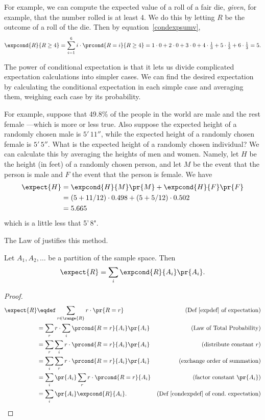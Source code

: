 For example, we can compute the expected value of a roll of a fair die,
\emph{given}, for example, that the number rolled is at least 4.  We do
this by letting $R$ be the outcome of a roll of the die.  Then
by equation~\eqref{condexpsumv},
\[
\expcond{R}{R \geq 4} = \sum_{i=1}^6 i \cdot \prcond{R=i}{R \ge 4} 
= 1\cdot 0 + 2\cdot 0 + 3\cdot 0 + 
  4\cdot\tfrac{1}{3} + 5\cdot\tfrac{1}{3} + 6\cdot\tfrac{1}{3} 
= 5.
\]

The power of conditional expectation is that it lets us divide complicated
expectation calculations into simpler cases.  We can find the desired
expectation by calculating the conditional expectation in each simple case
and averaging them, weighing each case by its probability.

For example, suppose that 49.8\% of the people in the world are male and
the rest female ---which is more or less true.  Also suppose the expected
height of a randomly chosen male is $5'\,11''$, while the expected height
of a randomly chosen female is $5'\,5''$.  What is the expected height of a
randomly chosen individual?  We can calculate this by averaging the
heights of men and women.  Namely, let $H$ be the height (in feet) of a
randomly chosen person, and let $M$ be the event that the person is male
and $F$ the event that the person is female.  We have
\begin{align*}
\expect{H} &= \expcond{H}{M} \pr{M} + \expcond{H}{F} \pr{F}\\
&= (5 + 11/12) \cdot 0.498  + (5+ 5/12) \cdot 0.502\\
&= 5.665
\end{align*}
which is a little less that 5'\,8".

The Law of  justifies this method.
\begin{theorem} \label{thm:condexp}
Let $A_1,A_2,\dots$ be a partition of the sample space.  Then
\[
\expect{R} = \sum_i \expcond{R}{A_i} \pr{A_i}.
\]
\end{theorem}

\begin{proof}
  \begin{align*}
    \expect{R} &\eqdef \sum_{r \in \range{R}} r \cdot \pr{R=r}
                  & \text{(Def~\ref{expdef} of expectation)}\\
    &= \sum_r r \cdot \sum_i \prcond{R=r}{A_i} \pr{A_i}
            & \text{(Law of Total Probability)}\\
    &= \sum_r \sum_i r \cdot \prcond{R=r}{A_i} \pr{A_i}
              & \text{(distribute constant $r$)}\\
    &= \sum_i \sum_r r \cdot \prcond{R=r}{A_i} \pr{A_i}
              & \text{(exchange order of summation)}\\
    &= \sum_i \pr{A_i} \sum_r r \cdot \prcond{R=r}{A_i}
             & \text{(factor constant $\pr{A_i}$)}\\
    &= \sum_i \pr{A_i} \expcond{R}{A_i}.
             & \text{(Def~\ref{condexpdef} of cond.\ expectation)}
  \end{align*}
\end{proof}


